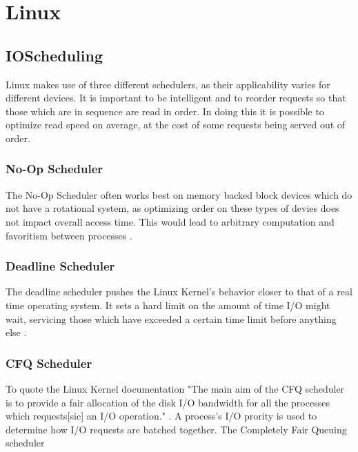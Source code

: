 \documentclass[letterpaper,10pt,notitlepage,fleqn]{article}
\begin{document}
\section{Linux}




\subsection{IOScheduling}


Linux makes use of three different schedulers, as their applicability varies for 
different devices. It is important to be intelligent and to reorder requests so that those
which are in sequence are read in order. In doing this it is possible to optimize read speed
on average, at the cost of some requests being served out of order. 

\subsubsection{No-Op Scheduler}

The No-Op Scheduler often works best on memory backed block devices which do not have a rotational
system, as optimizing order on these types of devies does not impact overall access time. This would
lead to arbitrary computation and favoritism between processes \cite{stackDisc}. 


\subsubsection{Deadline Scheduler}

The deadline scheduler pushes the Linux Kernel's behavior closer to that of a real time 
operating system. It sets a hard limit on the amount of time I/O might wait, servicing 
those which have exceeded a certain time limit before anything else \cite{stackDisc}. 

\subsubsection{CFQ Scheduler}

To quote the Linux Kernel documentation "The main aim of the CFQ scheduler is to 
provide a fair allocation of the disk I/O bandwidth for all the processes which requests[sic]
an I/O operation." \cite{CFQ}. A process's I/O prority is used to determine how I/O requests
are batched together. The Completely Fair Queuing scheduler 
\end{document}
